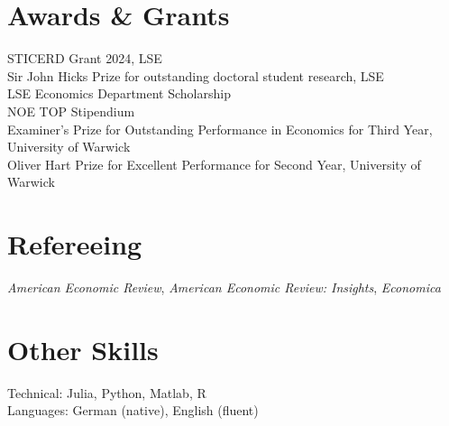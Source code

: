 \documentclass[10pt,a4paper]{article}
\newcommand{\awarditem}[1]{%
  #1 \\ [0.2em]
}
\begin{document}
\vspace{-0.5em}
\section{Awards \& Grants}
\awarditem{STICERD Grant 2024, LSE}
\awarditem{Sir John Hicks Prize for outstanding doctoral student research, LSE}
\awarditem{LSE Economics Department Scholarship}
\awarditem{NOE TOP Stipendium}
\awarditem{Examiner's Prize for Outstanding Performance in Economics for Third Year, University of Warwick}
\awarditem{Oliver Hart Prize for Excellent Performance for Second Year, University of Warwick}

\vspace{-0.5em}
\section{Refereeing}
\textit{American Economic Review}, \textit{American Economic Review: Insights}, \textit{Economica}

\vspace{-0.5em}
\section{Other Skills}
\awarditem{Technical: Julia, Python, Matlab, R}
\awarditem{Languages: German (native), English (fluent)}
\end{document}
